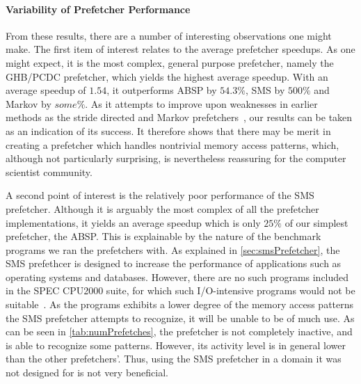 
\paragraph{Variability of Prefetcher Performance}
\label{par:varprefperf}



From these results, there are a number of interesting observations one
might make. The first item of interest relates to the average
prefetcher speedups. As one might expect, it is the most complex,
general purpose prefetcher, namely the GHB/PCDC prefetcher, which
yields the highest average speedup. With an average speedup of $1.54$,
it outperforms ABSP by $54.3\%$, SMS by $500\%$ and Markov by
$some\%$. As it attempts to improve upon weaknesses in earlier methods
as the stride directed and Markov prefetchers~\cite{Nesbit}, our
results can be taken as an indication of its success. It therefore
shows that there may be merit in creating a prefetcher which handles
nontrivial memory access patterns, which, although not particularly
surprising, is nevertheless reassuring for the computer scientist
community.%

A second point of interest is the relatively poor performance of the
SMS prefetcher. Although it is arguably the most complex of all the
prefetcher implementations, it yields an average speedup which is only
$25\%$ of our simplest prefetcher, the ABSP. This is explainable by
the nature of the benchmark programs we ran the prefetchers with. As
explained in \autoref{sec:smsPrefetcher}, the SMS prefethcer is
designed to increase the performance of applications such as operating
systems and databases. However, there are no such programs included in
the SPEC CPU2000 suite, for which such I/O-intensive programs would
not be suitable~\cite{SPECFAQ}. As the programs exhibits a lower
degree of the memory access patterns the SMS prefetcher attempts to
recognize, it will be unable to be of much use. As can be seen in
\autoref{tab:numPrefetches}, the prefetcher is not completely
inactive, and is able to recognize some patterns. However, its
activity level is in general lower than the other prefetchers'. Thus,
using the SMS prefetcher in a domain it was not designed for is not
very beneficial.


